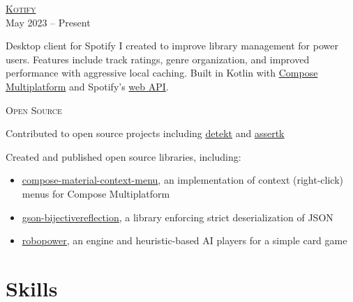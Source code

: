 \documentclass[letterpaper,10pt]{article}
\newenvironment{lcol}
{
    \begin{minipage}[t]{.185\linewidth}
    \begin{flushright}
}
{
    \end{flushright}
    \end{minipage}
}
\newenvironment{rcol}
{
    \begin{minipage}[t]{.8\linewidth}
}
{
    \end{minipage}
}
\begin{document}
\begin{lcol}
    \textsc{\href{https://github.com/dzirbel/kotify}{ Kotify}} \\
    May 2023 -- Present
\end{lcol}
\begin{rcol}
    Desktop client for Spotify I created to improve library management for power users. Features include track ratings, genre organization, and improved performance with aggressive local caching. Built in Kotlin with \href{https://www.jetbrains.com/lp/compose-multiplatform/}{Compose Multiplatform} and Spotify's \href{https://developer.spotify.com/documentation/web-api/}{web API}.
\end{rcol}

\vspace{4pt}

\begin{lcol}
    \textsc{Open Source}
\end{lcol}
\begin{rcol}
    Contributed to open source projects including \href{https://github.com/detekt/detekt/issues?q=author\%3Adzirbel}{\underline{ detekt}} and \href{https://github.com/willowtreeapps/assertk/issues?q=author\%3Adzirbel}{\underline{ assertk}}
    
    \vspace{4pt}

    Created and published open source libraries, including:
    
    \begin{itemize}[itemsep=2pt]
      \item \href{https://github.com/dzirbel/compose-material-context-menu}{ \underline{compose-material-context-menu}}, an implementation of context (right-click) menus for Compose Multiplatform
      \item \href{https://github.com/dzirbel/gson-bijectivereflection}{ \underline{gson-bijectivereflection}}, a library enforcing strict deserialization of JSON
      \item \href{https://github.com/dzirbel/robopower}{ \underline{robopower}}, an engine and heuristic-based AI players for a simple card game
    \end{itemize}
\end{rcol}

\section{Skills}
\end{document}
